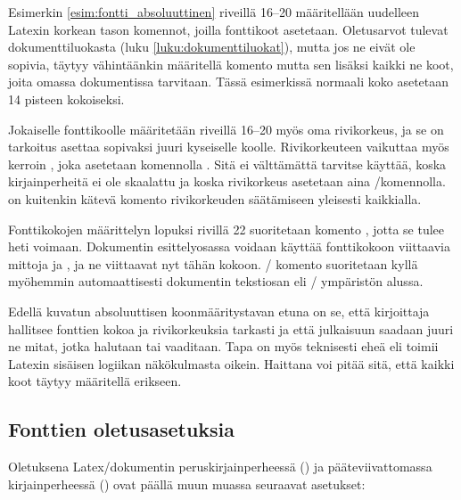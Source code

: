 \begin{koodilohkosis}
  \sffamilyabs\fontsize{16bp}{18bp}\bfseries
\end{koodilohkosis}

Esimerkin \ref{esim:fontti_absoluuttinen} riveillä 16--20 määritellään
uudelleen Latexin korkean tason komennot, joilla fonttikoot asetetaan.
Oletusarvot tulevat dokumenttiluokasta (luku
\ref{luku:dokumenttiluokat}), mutta jos ne eivät ole sopivia, täytyy
vähintäänkin määritellä komento  mutta sen lisäksi
kaikki ne koot, joita omassa dokumentissa tarvitaan. Tässä esimerkissä
normaali koko asetetaan 14 pisteen kokoiseksi.

Jokaiselle fonttikoolle määritetään riveillä 16--20 myös oma
rivikorkeus, ja se on tarkoitus asettaa sopivaksi juuri kyseiselle
koolle. Rivikorkeuteen vaikuttaa myös kerroin ,
joka asetetaan komennolla . Sitä ei välttämättä
tarvitse käyttää, koska kirjainperheitä ei ole skaalattu ja koska
rivikorkeus asetetaan aina \-/komennolla.
 on kuitenkin kätevä komento rivikorkeuden
säätämiseen yleisesti kaikkialla.

Fonttikokojen määrittelyn lopuksi rivillä 22 suoritetaan komento
, jotta se tulee heti voimaan. Dokumentin
esittelyosassa voidaan käyttää fonttikokoon viittaavia mittoja
 ja , ja ne viittaavat nyt tähän kokoon.
\-/ komento suoritetaan kyllä myöhemmin
automaattisesti dokumentin tekstiosan eli \-/
ympäristön alussa.

Edellä kuvatun absoluuttisen koonmääritystavan etuna on se, että
kirjoittaja hallitsee fonttien kokoa ja rivikorkeuksia tarkasti ja että
julkaisuun saadaan juuri ne mitat, jotka halutaan tai vaaditaan. Tapa on
myös teknisesti eheä eli toimii Latexin sisäisen logiikan näkökulmasta
oikein. Haittana voi pitää sitä, että kaikki koot täytyy määritellä
erikseen.

\subsection{Fonttien oletusasetuksia}
\label{luku:fontit_oletusasetukset}

Oletuksena Latex\-/dokumentin peruskirjainperheessä
() ja pääteviivattomassa kirjainperheessä
() ovat päällä muun muassa seuraavat asetukset:%


